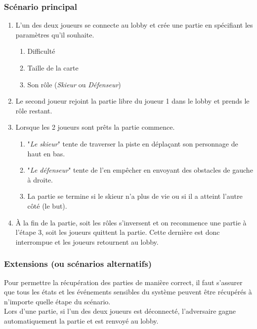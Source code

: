 \documentclass[a4paper,12pt]{article}
\begin{document}
	\subsubsection{Scénario principal}
	\begin{enumerate}
		\item L'un des deux joueurs se connecte au lobby et crée une partie en spécifiant les paramètres qu'il souhaite.
		\begin{enumerate}
			\item Difficulté
			\item Taille de la carte
			\item Son rôle (\textit{Skieur} ou \textit{Défenseur})
		\end{enumerate}
		\item Le second joueur rejoint la partie libre du joueur 1 dans le lobby et prends le rôle restant.
		\item Lorsque les 2 joueurs sont prêts la partie commence.
		\begin{enumerate}
			\item "\textit{Le skieur}" tente de traverser la piste en déplaçant son personnage de haut en bas.
			\item "\textit{Le défenseur}" tente de l'en empêcher en envoyant des obstacles de gauche à droite.
			\item La partie se termine si le skieur n'a plus de vie ou si il a atteint l'autre côté (le but).
		\end{enumerate}
		\item À la fin de la partie, soit les rôles s'inversent et on recommence une partie à l'étape 3, soit les joueurs quittent la partie. Cette dernière est donc interrompue et les joueurs retournent au lobby.
	\end{enumerate}
		
	\subsubsection{Extensions (ou scénarios alternatifs)}
	Pour permettre la récupération des parties de manière correct, il faut s'assurer que tous les états et les événements sensibles du système peuvent être récupérés à n'importe quelle étape du scénario. \\
	
	Lors d'une partie, si l'un des deux joueurs est déconnecté, l'adversaire gagne automatiquement la partie et est renvoyé au lobby.
	
\end{document}
